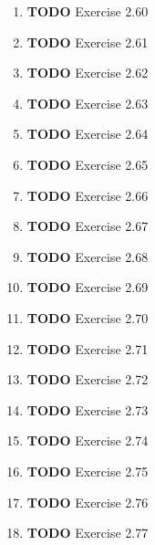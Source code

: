\documentclass[11pt]{article}
\begin{document}
\begin{enumerate}
\begin{enumerate}
\item {\bfseries\sffamily TODO} Exercise 2.60
\label{sec:org8bcef92}

\item {\bfseries\sffamily TODO} Exercise 2.61
\label{sec:org34c7328}

\item {\bfseries\sffamily TODO} Exercise 2.62
\label{sec:org5a288ee}

\item {\bfseries\sffamily TODO} Exercise 2.63
\label{sec:org075aecc}

\item {\bfseries\sffamily TODO} Exercise 2.64
\label{sec:org4f6e1b3}

\item {\bfseries\sffamily TODO} Exercise 2.65
\label{sec:orgeb03e48}

\item {\bfseries\sffamily TODO} Exercise 2.66
\label{sec:org882e6a4}

\item {\bfseries\sffamily TODO} Exercise 2.67
\label{sec:org8647788}

\item {\bfseries\sffamily TODO} Exercise 2.68
\label{sec:org7b02f0c}

\item {\bfseries\sffamily TODO} Exercise 2.69
\label{sec:org8e7d714}

\item {\bfseries\sffamily TODO} Exercise 2.70
\label{sec:orgd45a9e0}

\item {\bfseries\sffamily TODO} Exercise 2.71
\label{sec:org609e7b4}

\item {\bfseries\sffamily TODO} Exercise 2.72
\label{sec:orgf2a2ee7}

\item {\bfseries\sffamily TODO} Exercise 2.73
\label{sec:orgf4c0f47}

\item {\bfseries\sffamily TODO} Exercise 2.74
\label{sec:org8221d82}

\item {\bfseries\sffamily TODO} Exercise 2.75
\label{sec:org66f1979}

\item {\bfseries\sffamily TODO} Exercise 2.76
\label{sec:org0c6e6a7}

\item {\bfseries\sffamily TODO} Exercise 2.77
\label{sec:org184d26f}


\end{enumerate}
\end{enumerate}
\end{document}
